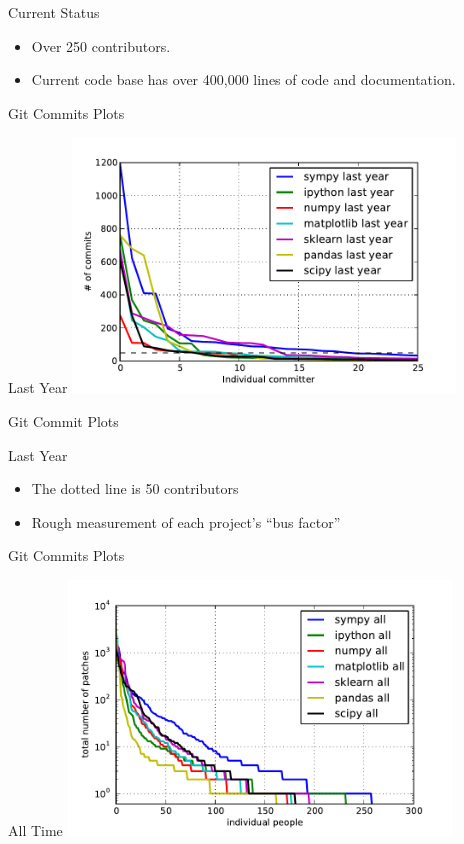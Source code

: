 \documentclass[xcolor=svgnames]{beamer}
\begin{document}
\begin{frame}
  \begin{block}{Current Status}
    \begin{itemize}
    \item Over 250 contributors.
    \item Current code base has over 400,000 lines of code and documentation.
    \end{itemize}
  \end{block}
\end{frame}

\begin{frame}{Git Commits Plots}
  \begin{block}{Last Year}
    \includegraphics[width=4in]{commits1.pdf}
  \end{block}
\end{frame}

\begin{frame}{Git Commit Plots}
  \begin{block}{Last Year}
    \begin{itemize}
    \item The dotted line is 50 contributors
    \item Rough measurement of each project's ``bus factor''
    \end{itemize}
  \end{block}
\end{frame}

\begin{frame}{Git Commits Plots}
  \begin{block}{All Time}
    \includegraphics[width=4in]{commits-all.pdf}
  \end{block}
\end{frame}
\end{document}

